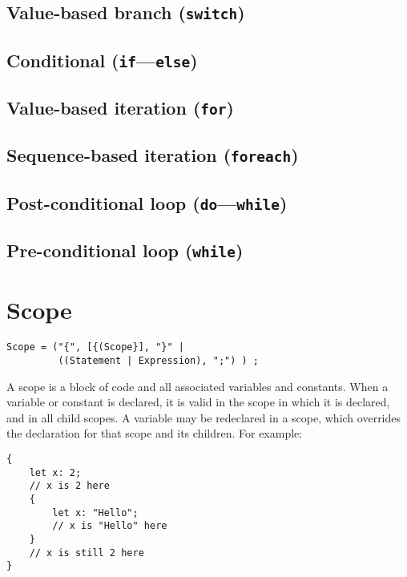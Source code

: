 \documentclass{article}
\begin{document}
\subsection{Value-based branch (\texttt{switch})}
\label{sub:statements:switch}

\subsection{Conditional (\texttt{if}---\texttt{else})}
\label{sub:statements:if}

\subsection{Value-based iteration (\texttt{for})}
\label{sub:statements:for}

\subsection{Sequence-based iteration (\texttt{foreach})}
\label{sub:statements:foreach}

\subsection{Post-conditional loop (\texttt{do}---\texttt{while})}
\label{sub:statements:do}

\subsection{Pre-conditional loop (\texttt{while})}
\label{sub:statements:while}

\section{Scope}
\label{sec:scope}
\begin{verbatim}
Scope = ("{", [{(Scope}], "}" |
         ((Statement | Expression), ";") ) ;
\end{verbatim}
A scope is a block of code and all associated variables and constants. When a
variable or constant is declared, it is valid in the scope in which it is declared,
and in all child scopes. A variable may be redeclared in a scope, which overrides
the declaration for that scope and its children. For example:
\begin{verbatim}
{
    let x: 2;
    // x is 2 here
    {
        let x: "Hello";
        // x is "Hello" here
    }
    // x is still 2 here
}
\end{verbatim}
\end{document}
